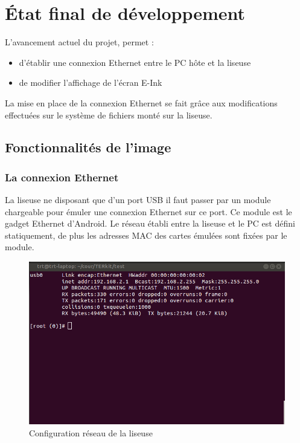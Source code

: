 \chapter{État final de développement}

L'avancement actuel du projet, permet : 
\begin{itemize}
	\item d'établir une connexion Ethernet entre le PC hôte et la liseuse
	\item de modifier l'affichage de l'écran E-Ink
\end{itemize}

La mise en place de la connexion Ethernet se fait grâce aux modifications effectuées sur le système de fichiers monté sur la liseuse.

\section{Fonctionnalités de l'image} %

\subsection{La connexion Ethernet}
La liseuse ne disposant que d'un port USB il faut passer par un module chargeable pour émuler une connexion Ethernet sur ce port.
Ce module est le gadget Ethernet d'Android.
Le réseau établi entre la liseuse et le PC est défini statiquement, de plus les adresses MAC des cartes émulées sont fixées par le module.

\begin{figure}[]
	\begin{center}
	\includegraphics[scale=0.5]{capt_prs_ifconfig.png}	
	\end{center}
	\caption{Configuration réseau de la liseuse}
\end{figure}

